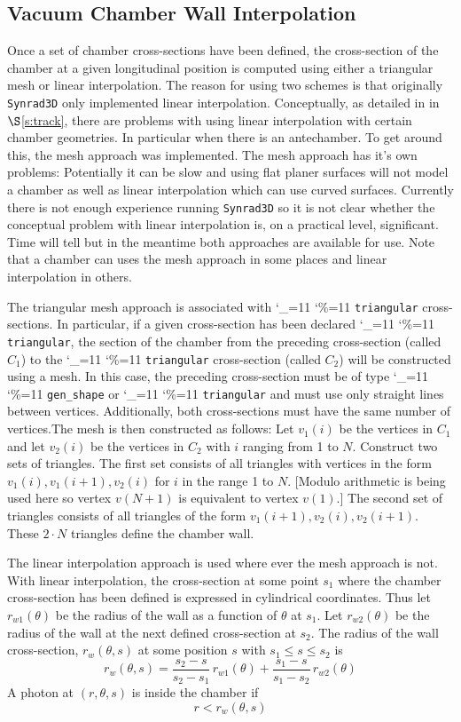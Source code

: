 \documentclass[11pt]{article}
\newcommand{\sref}[1]{$\S$\ref{#1}}
\newcommand{\srthree}{\texttt{Synrad3D}\xspace}
\newcommand\ttcmd{\begingroup\catcode`\_=11 \catcode`\%=11 \dottcmd}
\newcommand\dottcmd[1]{\texttt{#1}\endgroup}
\newcommand{\Begineq}{\begin{equation}}
\newcommand{\Endeq}{\end{equation}}
\newcommand{\vn}{\ttcmd}
\begin{document}
{%
\subsection{Vacuum Chamber Wall Interpolation} 
\label{s:wall}

Once a set of chamber cross-sections have been defined, the
cross-section of the chamber at a given longitudinal position is
computed using either a triangular mesh or linear interpolation. The
reason for using two schemes is that originally \srthree only
implemented linear interpolation.  Conceptually, as detailed in in
\sref{s:track}, there are problems with using linear interpolation
with certain chamber geometries. In particular when there is an
antechamber. To get around this, the mesh approach was implemented.
The mesh approach has it's own problems: Potentially it can be slow
and using flat planer surfaces will not model a chamber as well as
linear interpolation which can use curved surfaces. Currently there
is not enough experience running \srthree so it is not clear whether
the conceptual problem with linear interpolation is, on a practical
level, significant. Time will tell but in the meantime both approaches
are available for use. Note that a chamber can uses the mesh approach
in some places and linear interpolation in others.

The triangular mesh approach is associated with \vn{triangular}
cross-sections. In particular, if a given cross-section has been
declared \vn{triangular}, the section of the chamber from the
preceding cross-section (called $C_1$) to the \vn{triangular}
cross-section (called $C_2$) will be constructed using a mesh. In this
case, the preceding cross-section must be of type \vn{gen_shape} or
\vn{triangular} and must use only straight lines between
vertices. Additionally, both cross-sections must have the same number
of vertices.The mesh is then constructed as follows: Let $v_1(i)$ be
the vertices in $C_1$ and let $v_2(i)$ be the vertices in $C_2$ with
$i$ ranging from 1 to $N$. Construct two sets of triangles. The first
set consists of all triangles with vertices in the form $v_1(i),
v_1(i+1), v_2(i)$ for $i$ in the range 1 to $N$. [Modulo arithmetic is
being used here so vertex $v(N+1)$ is equivalent to vertex $v(1)$.]
The second set of triangles consists of all triangles of the form
$v_1(i+1), v_2(i), v_2(i+1)$. These $2 \cdot N$ triangles define the
chamber wall.

The linear interpolation approach is used where ever the mesh approach
is not.  With linear interpolation, the cross-section at some point
$s_1$ where the chamber cross-section has been defined is expressed in
cylindrical coordinates.  Thus let $r_{w1}(\theta)$ be the radius of
the wall as a function of $\theta$ at $s_1$.  Let $r_{w2}(\theta)$ be
the radius of the wall at the next defined cross-section at $s_2$. The
radius of the wall cross-section, $r_w(\theta, s)$ at some position
$s$ with $s_1 \le s \le s_2$ is
\Begineq
  r_w(\theta, s) = 
  \frac{s_2 - s}{s_2 - s_1} \, r_{w1}(\theta) + 
  \frac{s_1 - s}{s_1 - s_2} \, r_{w2}(\theta)
  \label{rssss}
\Endeq
A photon at $(r,\theta, s)$ is inside the chamber if
\Begineq
  r < r_w(\theta, s)
\Endeq

}
\end{document}

